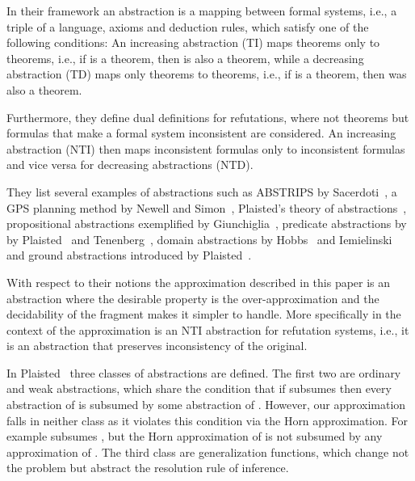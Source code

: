 \documentclass{llncs}
\begin{document}
In their framework an abstraction is a mapping between formal systems, i.e., a triple of a language, axioms and deduction rules, which satisfy one of the following conditions:
An increasing abstraction (TI)  maps theorems only to theorems, i.e., if  is a theorem, then  is also a theorem, 
while a decreasing abstraction (TD)   maps only theorems to theorems, i.e., if  is a theorem, then  was also a theorem.

Furthermore, they define dual definitions for refutations, where not theorems but formulas that make a formal system inconsistent  are considered.
An increasing abstraction (NTI) then maps inconsistent formulas only to inconsistent formulas and vice versa for decreasing abstractions (NTD).

They list several examples of abstractions such as  ABSTRIPS by Sacerdoti~\cite{Sacerdott:1973:PHA:1624775.1624826}, a GPS planning method by Newell and Simon~\cite{Newell:1972:HPS:1095704}, Plaisted's theory of abstractions~\cite{journals/ai/Plaisted81}, propositional abstractions exemplified by Giunchiglia~\cite{conf/ecai/GiunchigliaG88}, predicate abstractions by by Plaisted~\cite{journals/ai/Plaisted81} and Tenenberg~\cite{Tenenberg87preservingconsistency}, domain abstractions by Hobbs~\cite{Hobbs85granularity} and Iemielinski~\cite{Imielinski:1987:DAL:1625995.1626083} and ground abstractions introduced by Plaisted~\cite{journals/ai/Plaisted81}.

With respect to their notions the approximation described in this paper is an abstraction where the desirable property is the over-approximation and the decidability of the fragment makes it simpler to handle. More specifically in the context of \cite{Giunchiglia:1992:TA:146945.146951} the approximation is an NTI abstraction for refutation systems, i.e., it is an abstraction that preserves inconsistency of the original. 

In  Plaisted~\cite{journals/ai/Plaisted81} three classes of abstractions are defined. The first two are ordinary and weak abstractions, which share the condition that if  subsumes  then every abstraction of  is subsumed by some abstraction of . However, our approximation falls in neither class as it violates this condition via the Horn approximation. For example  subsumes , but the Horn 
approximation  of  is not subsumed by any approximation of .    
The third class are generalization functions, which change not the problem but abstract the resolution rule of inference. 
\end{document}
